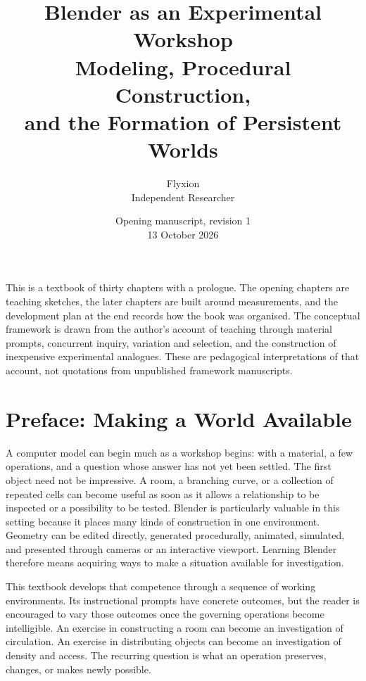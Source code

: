 \documentclass[11pt,openany]{book}
\title{\Huge\bfseries Blender as an Experimental Workshop\\[0.6em]
\Large Modeling, Procedural Construction,\\ and the Formation of Persistent Worlds}
\author{Flyxion\\[0.3em]\normalsize Independent Researcher}
\date{Opening manuscript, revision 1\\13 October 2026}
\begin{document}
\frontmatter
\maketitle

\begin{center}
\begin{minipage}{0.82\textwidth}
\small
This is a textbook of thirty chapters with a prologue. The opening chapters are teaching sketches, the later chapters are built around measurements, and the development plan at the end records how the book was organised. The conceptual framework is drawn from the author's account of teaching through material prompts, concurrent inquiry, variation and selection, and the construction of inexpensive experimental analogues. These are pedagogical interpretations of that account, not quotations from unpublished framework manuscripts.
\end{minipage}
\end{center}

\tableofcontents

\chapter*{Preface: Making a World Available}

A computer model can begin much as a workshop begins: with a material, a few operations, and a question whose answer has not yet been settled. The first object need not be impressive. A room, a branching curve, or a collection of repeated cells can become useful as soon as it allows a relationship to be inspected or a possibility to be tested. Blender is particularly valuable in this setting because it places many kinds of construction in one environment. Geometry can be edited directly, generated procedurally, animated, simulated, and presented through cameras or an interactive viewport. Learning Blender therefore means acquiring ways to make a situation available for investigation.

This textbook develops that competence through a sequence of working environments. Its instructional prompts have concrete outcomes, but the reader is encouraged to vary those outcomes once the governing operations become intelligible. An exercise in constructing a room can become an investigation of circulation. An exercise in distributing objects can become an investigation of density and access. The recurring question is what an operation preserves, changes, or makes newly possible.
\end{document}
